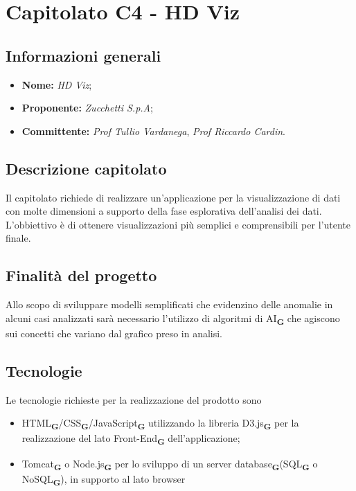\section{Capitolato C4 - HD Viz}

\subsection{Informazioni generali}

\begin{itemize}
\item \textbf{Nome:} \textit{HD Viz};
\item \textbf{Proponente:} \textit{Zucchetti S.p.A};
\item \textbf{Committente:} \emph{Prof Tullio Vardanega}, \emph{Prof Riccardo Cardin}.
\end{itemize}

\subsection{Descrizione capitolato}
Il capitolato richiede di realizzare un'applicazione per la
visualizzazione di dati con molte dimensioni a supporto della fase esplorativa
dell'analisi dei dati. L'obbiettivo è di ottenere visualizzazioni più semplici e comprensibili per l'utente finale. 

\subsection{Finalità del progetto}
Allo scopo di sviluppare modelli semplificati che evidenzino delle anomalie in alcuni casi analizzati sarà necessario l'utilizzo di algoritmi di AI\textsubscript{\textbf{G}} che agiscono sui concetti che variano dal grafico preso in analisi.
 
\subsection{Tecnologie}
Le tecnologie richieste per la realizzazione del prodotto sono 
\begin{itemize}
\item HTML\textsubscript{\textbf{G}}/CSS\textsubscript{\textbf{G}}/JavaScript\textsubscript{\textbf{G}} utilizzando la libreria D3.js\textsubscript{\textbf{G}} per la realizzazione del lato Front-End\textsubscript{\textbf{G}} dell'applicazione;
\item Tomcat\textsubscript{\textbf{G}} o Node.js\textsubscript{\textbf{G}} per lo sviluppo di un server database\textsubscript{\textbf{G}}(SQL\textsubscript{\textbf{G}} o NoSQL\textsubscript{\textbf{G}}), in supporto al lato browser
\end{itemize}


